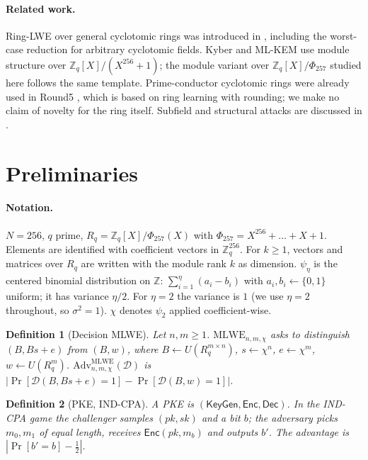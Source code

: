 \documentclass[11pt]{article}
\newtheorem{definition}{Definition}
\theoremstyle{remark}
\newcommand{\Z}{\mathbb{Z}}
\newcommand{\Rq}{R_q}
\begin{document}
\paragraph{Related work.} Ring-LWE over general cyclotomic rings was introduced in \cite{LPR13}, including the worst-case reduction for arbitrary cyclotomic fields. Kyber \cite{BDKLLSSS18} and ML-KEM use module structure over $\Z_q[X]/(X^{256}+1)$; the module variant over $\Z_q[X]/\Phi_{257}$ studied here follows the same template. Prime-conductor cyclotomic rings were already used in Round5 \cite{Round5}, which is based on ring learning with rounding; we make no claim of novelty for the ring itself. Subfield and structural attacks are discussed in \cite{ABD16,CJL16,CDPR16,CDW17}.

\section{Preliminaries}
\paragraph{Notation.} $N=256$, $q$ prime, $\Rq=\Z_q[X]/\Phi_{257}(X)$ with $\Phi_{257}=X^{256}+\dots+X+1$. Elements are identified with coefficient vectors in $\Z_q^{256}$. For $k\ge1$, vectors and matrices over $\Rq$ are written with the module rank $k$ as dimension. $\psi_\eta$ is the centered binomial distribution on $\Z$: $\sum_{i=1}^{\eta}(a_i-b_i)$ with $a_i,b_i\leftarrow\{0,1\}$ uniform; it has variance $\eta/2$. For $\eta=2$ the variance is $1$ (we use $\eta=2$ throughout, so $\sigma^2=1$). $\chi$ denotes $\psi_2$ applied coefficient-wise.

\begin{definition}[Decision MLWE]
Let $n,m\ge1$. $\mathrm{MLWE}_{n,m,\chi}$ asks to distinguish $(B,Bs+e)$ from $(B,w)$, where $B\leftarrow U(\Rq^{m\times n})$, $s\leftarrow\chi^n$, $e\leftarrow\chi^m$, $w\leftarrow U(\Rq^m)$. $\mathrm{Adv}^{\mathrm{MLWE}}_{n,m,\chi}(\mathcal D)$ is $|\Pr[\mathcal D(B,Bs+e)=1]-\Pr[\mathcal D(B,w)=1]|$.
\end{definition}

\begin{definition}[PKE, IND-CPA]
A PKE is $(\mathsf{KeyGen},\mathsf{Enc},\mathsf{Dec})$. In the IND-CPA game the challenger samples $(pk,sk)$ and a bit $b$; the adversary picks $m_0,m_1$ of equal length, receives $\mathsf{Enc}(pk,m_b)$ and outputs $b'$. The advantage is $|\Pr[b'=b]-\tfrac12|$.
\end{definition}
\end{document}
